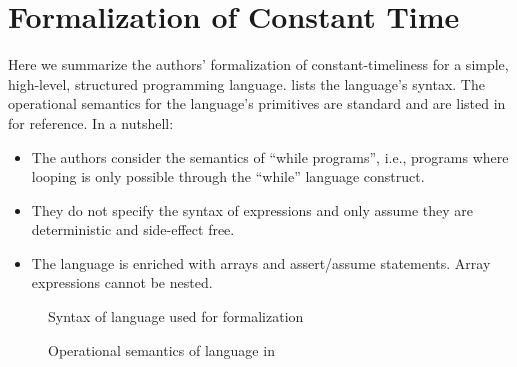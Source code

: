 \section{Formalization of Constant Time}
\label{sec:prelimnaries}


Here we summarize the authors' formalization of constant-timeliness for a simple, high-level, structured programming language.
 lists the language's syntax.
The operational semantics for the language's primitives are standard and are listed in  for reference.
In a nutshell:
\begin{itemize}
  \item The authors consider the semantics of ``while programs'', i.e., programs where looping is only possible through the ``while'' language construct.
  \item They do not specify the syntax of expressions and only assume they are deterministic and side-effect free.
  \item The language is enriched with arrays and assert/assume statements. Array expressions cannot be nested.
\end{itemize}

\begin{figure}[h!]
\centering
{}
 \caption{Syntax of language used for formalization}
 \label{fig:syntax}
\end{figure}

\begin{figure}[h!]
\centering
{}
 \caption{Operational semantics of language in }
 \label{fig:semantics}
\end{figure}

